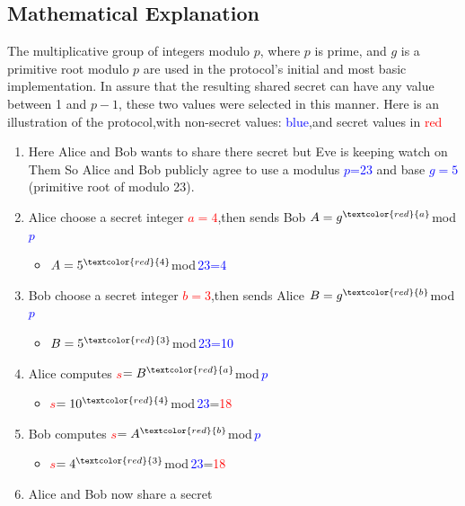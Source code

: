 \documentclass{article}
\begin{document}
\subsection{Mathematical Explanation}
The multiplicative group of integers modulo $p$, where $p$ is prime, and $g$ is a primitive root modulo $p$ are used in the protocol's initial and most basic implementation. In assure that the resulting shared secret can have any value between 1 and $p-1$, these two values were selected in this manner. Here is an illustration of the protocol,with non-secret values: \textcolor{blue}{blue},and secret values in \textcolor{red}{red}
\begin{enumerate}
    \item Here Alice and Bob wants to share there secret but Eve is keeping watch on Them So Alice and Bob publicly agree to use a modulus \textcolor{blue}{$p$=23} and base \textcolor{blue}{$g=5$}(primitive root of modulo 23).
    \item Alice choose a secret integer \textcolor{red}{$a=4$},then sends Bob \textcolor{blue}{\(A=g^\textcolor{red}{a}\)}\:mod\,\textcolor{blue}{$p$}
    \begin{itemize}
        \item \textcolor{blue}{\(A=5^\textcolor{red}{4}\)}\:mod\,\textcolor{blue}{23=4}
\end{itemize}
    \item Bob choose a secret integer \textcolor{red}{$b=3$},then sends Alice \textcolor{blue}{\(B=g^\textcolor{red}{b}\)}\:mod\,\textcolor{blue}{$p$}
    \begin{itemize}
        \item \textcolor{blue}{\(B=5^\textcolor{red}{3}\)}\:mod\,\textcolor{blue}{23=10}
\end{itemize}
    \item Alice computes \textcolor{red}{$s$}\textcolor{blue}{\(=B^\textcolor{red}{a}\)}\:mod\,\textcolor{blue}{$p$}
    \begin{itemize}
        \item \textcolor{red}{$s$}\textcolor{blue}{\(=10^\textcolor{red}{4}\)}\:mod\,\textcolor{blue}{23}=\textcolor{red}{18}
    \end{itemize}
    \item Bob computes \textcolor{red}{$s$}\textcolor{blue}{\(=A^\textcolor{red}{b}\)}\:mod\,\textcolor{blue}{$p$}
    \begin{itemize}
        \item \textcolor{red}{$s$}\textcolor{blue}{\(=4^\textcolor{red}{3}\)}\:mod\,\textcolor{blue}{23}=\textcolor{red}{18}
    \end{itemize}
    \item Alice and Bob now share a secret
\end{enumerate}
\end{document}
